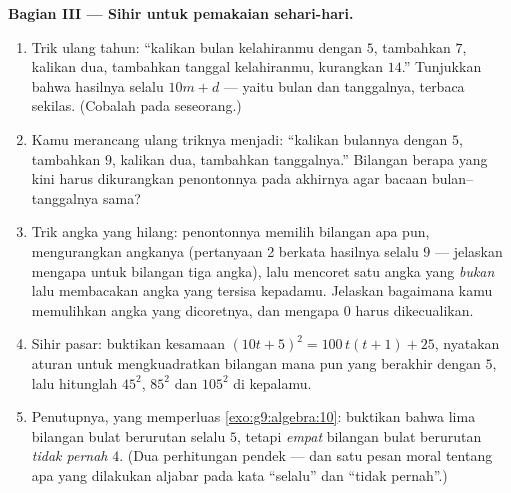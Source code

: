 \begin{problem}
\medskip
\noindent\textbf{Bagian III --- Sihir untuk pemakaian sehari-hari.}
\begin{enumerate}[resume]
  \item Trik ulang tahun: ``kalikan bulan kelahiranmu dengan $5$,
        tambahkan $7$, kalikan dua, tambahkan tanggal kelahiranmu,
        kurangkan $14$.'' Tunjukkan bahwa hasilnya selalu $10m + d$
        --- yaitu bulan dan tanggalnya, terbaca sekilas. (Cobalah
        pada seseorang.)
  \item Kamu merancang ulang triknya menjadi: ``kalikan bulannya
        dengan $5$, tambahkan $9$, kalikan dua, tambahkan
        tanggalnya.'' Bilangan berapa yang kini harus dikurangkan
        penontonnya pada akhirnya agar bacaan bulan--tanggalnya
        sama?
  \item Trik angka yang hilang: penontonnya memilih bilangan apa
        pun, mengurangkan  angkanya (pertanyaan 2 berkata
        hasilnya selalu  $9$ --- jelaskan mengapa untuk
        bilangan tiga angka), lalu mencoret satu angka yang
        \emph{bukan } lalu membacakan angka yang tersisa
        kepadamu. Jelaskan bagaimana kamu memulihkan angka yang
        dicoretnya, dan mengapa $0$ harus dikecualikan.
  \item Sihir pasar: buktikan kesamaan
        $(10t + 5)^2 = 100\,t(t+1) + 25$, nyatakan aturan untuk
        mengkuadratkan bilangan mana pun yang berakhir dengan $5$,
        lalu hitunglah $45^2$, $85^2$ dan $105^2$ di kepalamu.
  \item Penutupnya, yang memperluas \cref{exo:g9:algebra:10}:
        buktikan bahwa  lima bilangan bulat berurutan selalu
         $5$, tetapi  \emph{empat} bilangan bulat
        berurutan \emph{tidak pernah}  $4$.
        (Dua perhitungan pendek --- dan satu pesan moral tentang apa
        yang dilakukan aljabar pada kata ``selalu'' dan ``tidak
        pernah''.)

\end{enumerate}
\end{problem}
